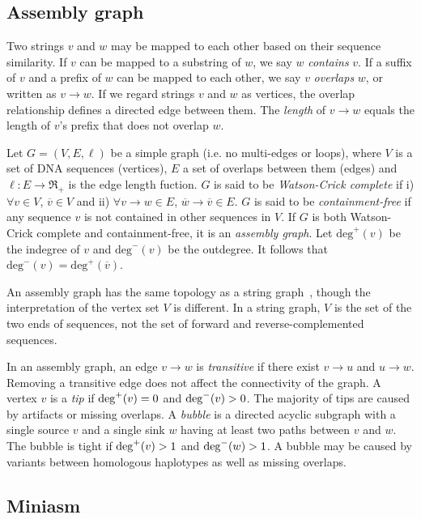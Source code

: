 \documentclass{bioinfo}
\begin{document}
\begin{methods}
\subsection{Assembly graph}

Two strings $v$ and $w$ may be mapped to each other based on their sequence
similarity. If $v$ can be mapped to a substring of $w$, we say $w$
\emph{contains} $v$. If a suffix of $v$ and a prefix of $w$ can be mapped to
each other, we say $v$ \emph{overlaps} $w$, or written as $v\to w$.
If we regard strings $v$ and $w$ as vertices, the overlap relationship defines
a directed edge between them. The \emph{length} of $v\to w$ equals the length
of $v$'s prefix that does not overlap $w$.

Let $G=(V,E,\ell)$ be a simple graph (i.e. no multi-edges or loops), where $V$ is a
set of DNA sequences (vertices), $E$ a set of overlaps between them (edges) and
$\ell:E\to\Re_+$ is the edge length fuction. $G$ is said to be
\emph{Watson-Crick complete} if i) $\forall v\in V$, $\overline{v}\in V$ and
ii) $\forall v\to w\in E$, $\overline{w}\to\overline{v}\in E$. $G$ is said to
be \emph{containment-free} if any sequence $v$ is not contained in other
sequences in $V$. If $G$ is both Watson-Crick complete and containment-free, it
is an \emph{assembly graph}. Let $\mathrm{deg}^+(v)$ be the indegree of $v$ and
$\mathrm{deg}^-(v)$ be the outdegree. It follows that
$\mathrm{deg}^-(v)=\mathrm{deg}^+(\overline{v})$.

An assembly graph has the same topology as a string graph~\citep{Myers:2005bh},
though the interpretation of the vertex set $V$ is different. In a string
graph, $V$ is the set of the two ends of sequences, not the set of forward and
reverse-complemented sequences.

In an assembly graph, an edge $v\to w$ is \emph{transitive} if there exist
$v\to u$ and $u\to w$. Removing a transitive edge does not affect the
connectivity of the graph. A vertex $v$ is a \emph{tip} if ${\rm deg}^+(v)=0$
and ${\rm deg}^-(v)>0$. The majority of tips are caused by artifacts or missing
overlaps. A \emph{bubble} is a directed acyclic subgraph with a single source
$v$ and a single sink $w$ having at least two paths between $v$ and $w$. The
bubble is tight if ${\rm deg}^+(v)>1$ and ${\rm deg}^-(w)>1$. A bubble may be
caused by variants between homologous haplotypes as well as missing overlaps.

\subsection{Miniasm}


\end{methods}
\end{document}

